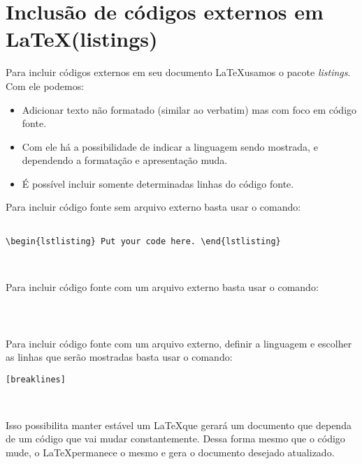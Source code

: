 \section{Inclusão de códigos externos em \LaTeX (listings)}

\begin{frame}[fragile]
\begin{block}{}
Para incluir códigos externos em seu documento \LaTeX usamos o pacote {\it listings}. Com ele podemos:
\begin{itemize}
 \item Adicionar texto não formatado (similar ao verbatim) mas com foco em código fonte.
 \item Com ele há a possibilidade de indicar a linguagem sendo mostrada, e dependendo a formatação e apresentação muda.
 \item É possível incluir somente determinadas linhas do código fonte.
\end{itemize}
\end{block}
\end{frame}


\begin{frame}[fragile]

Para incluir código fonte sem arquivo externo basta usar o comando: 

\begin{verbatim}
 
\begin{lstlisting} Put your code here. \end{lstlisting}

 
\end{verbatim}


\end{frame}


\begin{frame}[fragile]

Para incluir código fonte com um arquivo externo basta usar o comando: 

\begin{verbatim}
 


\end{verbatim}


\end{frame}

\begin{frame}[fragile]

Para incluir código fonte com um arquivo externo, definir a linguagem e escolher as linhas que serão mostradas basta usar o comando: 

\begin{verbatim}[breaklines]
 


\end{verbatim}

Isso possibilita manter estável um \LaTeX que gerará um documento que dependa de um código que vai mudar constantemente. Dessa forma mesmo que o código mude, o \LaTeX permanece o mesmo e gera o documento desejado atualizado.


\end{frame}


